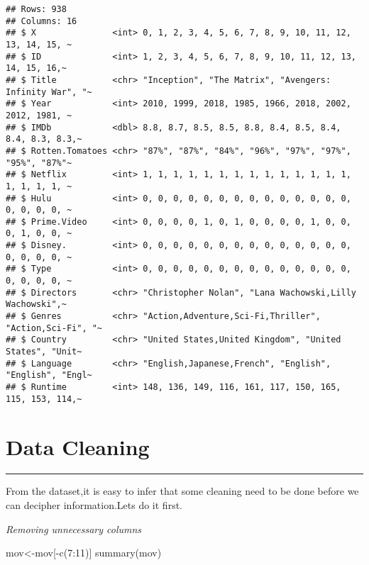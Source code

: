 \documentclass[
]{article}
\newenvironment{Shaded}{\begin{snugshade}}{\end{snugshade}}
\newcommand{\DecValTok}[1]{\textcolor[rgb]{0.00,0.00,0.81}{#1}}
\newcommand{\FunctionTok}[1]{\textcolor[rgb]{0.00,0.00,0.00}{#1}}
\newcommand{\NormalTok}[1]{#1}
\newcommand{\OtherTok}[1]{\textcolor[rgb]{0.56,0.35,0.01}{#1}}
\newcommand{\SpecialCharTok}[1]{\textcolor[rgb]{0.00,0.00,0.00}{#1}}
\begin{document}
\begin{verbatim}
## Rows: 938
## Columns: 16
## $ X               <int> 0, 1, 2, 3, 4, 5, 6, 7, 8, 9, 10, 11, 12, 13, 14, 15, ~
## $ ID              <int> 1, 2, 3, 4, 5, 6, 7, 8, 9, 10, 11, 12, 13, 14, 15, 16,~
## $ Title           <chr> "Inception", "The Matrix", "Avengers: Infinity War", "~
## $ Year            <int> 2010, 1999, 2018, 1985, 1966, 2018, 2002, 2012, 1981, ~
## $ IMDb            <dbl> 8.8, 8.7, 8.5, 8.5, 8.8, 8.4, 8.5, 8.4, 8.4, 8.3, 8.3,~
## $ Rotten.Tomatoes <chr> "87%", "87%", "84%", "96%", "97%", "97%", "95%", "87%"~
## $ Netflix         <int> 1, 1, 1, 1, 1, 1, 1, 1, 1, 1, 1, 1, 1, 1, 1, 1, 1, 1, ~
## $ Hulu            <int> 0, 0, 0, 0, 0, 0, 0, 0, 0, 0, 0, 0, 0, 0, 0, 0, 0, 0, ~
## $ Prime.Video     <int> 0, 0, 0, 0, 1, 0, 1, 0, 0, 0, 0, 1, 0, 0, 0, 1, 0, 0, ~
## $ Disney.         <int> 0, 0, 0, 0, 0, 0, 0, 0, 0, 0, 0, 0, 0, 0, 0, 0, 0, 0, ~
## $ Type            <int> 0, 0, 0, 0, 0, 0, 0, 0, 0, 0, 0, 0, 0, 0, 0, 0, 0, 0, ~
## $ Directors       <chr> "Christopher Nolan", "Lana Wachowski,Lilly Wachowski",~
## $ Genres          <chr> "Action,Adventure,Sci-Fi,Thriller", "Action,Sci-Fi", "~
## $ Country         <chr> "United States,United Kingdom", "United States", "Unit~
## $ Language        <chr> "English,Japanese,French", "English", "English", "Engl~
## $ Runtime         <int> 148, 136, 149, 116, 161, 117, 150, 165, 115, 153, 114,~
\end{verbatim}

\hypertarget{data}{%
\section{\texorpdfstring{\textbf{Data
Cleaning}}{Data Cleaning}}\label{data}}

\begin{center}\rule{0.5\linewidth}{0.5pt}\end{center}

From the dataset,it is easy to infer that some cleaning need to be done
before we can decipher information.Lets do it first.

\emph{Removing unnecessary columns}

\begin{Shaded}
\begin{Highlighting}[]
\NormalTok{mov}\OtherTok{\textless{}{-}}\NormalTok{mov[}\SpecialCharTok{{-}}\FunctionTok{c}\NormalTok{(}\DecValTok{7}\SpecialCharTok{:}\DecValTok{11}\NormalTok{)]  }
\FunctionTok{summary}\NormalTok{(mov)}
\end{Highlighting}
\end{Shaded}
\end{document}
